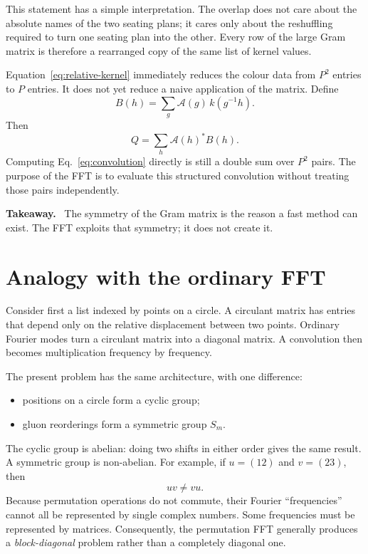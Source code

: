 \documentclass[11pt,a4paper]{article}
\newcommand{\cA}{\mathcal{A}}
\newenvironment{takeaway}
  {\par\medskip\noindent\begin{minipage}{\linewidth}
   \color{blue!50!black}\textbf{Takeaway.}\ \color{black}}
  {\end{minipage}\par\medskip}
\begin{document}
This statement has a simple interpretation.  The overlap does not care about
the absolute names of the two seating plans; it cares only about the
reshuffling required to turn one seating plan into the other.  Every row of
the large Gram matrix is therefore a rearranged copy of the same list of
kernel values.

Equation~\eqref{eq:relative-kernel} immediately reduces the colour data from
$P^2$ entries to $P$ entries.  It does not yet reduce a naive application
of the matrix.  Define
\begin{equation}
  B(h)=\sum_g \cA(g)\,k(g^{-1}h).
  \label{eq:convolution}
\end{equation}
Then
\begin{equation}
  Q=\sum_h \cA(h)^* B(h).
  \label{eq:q-from-convolution}
\end{equation}
Computing Eq.~\eqref{eq:convolution} directly is still a double sum over
$P^2$ pairs.  The purpose of the FFT is to evaluate this structured
convolution without treating those pairs independently.

\begin{takeaway}
The symmetry of the Gram matrix is the reason a fast method can exist.  The
FFT exploits that symmetry; it does not create it.
\end{takeaway}

\section{Analogy with the ordinary FFT}

Consider first a list indexed by points on a circle.  A circulant matrix has
entries that depend only on the relative displacement between two points.
Ordinary Fourier modes turn a circulant matrix into a diagonal matrix.  A
convolution then becomes multiplication frequency by frequency.

The present problem has the same architecture, with one difference:
\begin{itemize}
  \item positions on a circle form a cyclic group;
  \item gluon reorderings form a symmetric group $S_m$.
\end{itemize}
The cyclic group is abelian: doing two shifts in either order gives the same
result.  A symmetric group is non-abelian.  For example, if
$u=(12)$ and $v=(23)$, then
\begin{equation}
  uv\ne vu.
\end{equation}
Because permutation operations do not commute, their Fourier ``frequencies''
cannot all be represented by single complex numbers.  Some frequencies must
be represented by matrices.  Consequently, the permutation FFT generally
produces a \emph{block-diagonal} problem rather than a completely diagonal
one.
\end{document}
